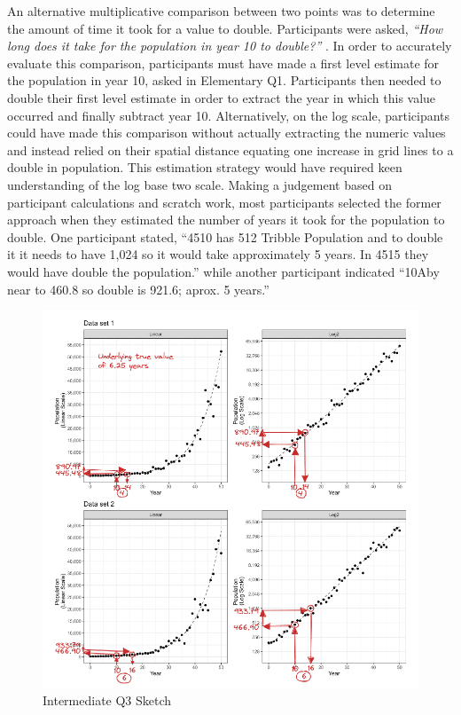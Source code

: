 \documentclass[print]{nuthesis}
\begin{document}
An alternative multiplicative comparison between two points was to determine the amount of time it took for a value to double.
Participants were asked, \emph{``How long does it take for the population in year 10 to double?''} .
In order to accurately evaluate this comparison, participants must have made a first level estimate for the population in year 10, asked in Elementary Q1.
Participants then needed to double their first level estimate in order to extract the year in which this value occurred and finally subtract year 10.
Alternatively, on the log scale, participants could have made this comparison without actually extracting the numeric values and instead relied on their spatial distance equating one increase in grid lines to a double in population.
This estimation strategy would have required keen understanding of the log base two scale.
Making a judgement based on participant calculations and scratch work, most participants selected the former approach when they estimated the number of years it took for the population to double.
One participant stated, ``4510 has 512 Tribble Population and to double it it needs to have 1,024 so it would take approximately 5 years. In 4515 they would have double the population.'' while another participant indicated ``10Aby near to 460.8 so double is 921.6; aprox. 5 years.''

\begin{figure}[tbp]

{\centering \includegraphics[width=1\linewidth,]{images/03-estimation/qi3-sketch} 

}

\caption{Intermediate Q3 Sketch}\label{fig:qi3-sketch}
\end{figure}
\end{document}
